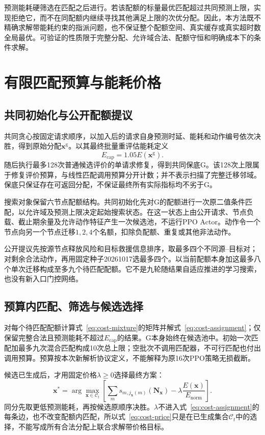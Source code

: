 预测能耗硬筛选在匹配之后进行。若该配额的标量最优匹配超过共同预测上限，实现拒绝它，而不在同配额内继续寻找其他满足上限的次优分配。因此，本方法既不精确求解带能耗约束的指派问题，也不保证整个配额空间、真实缓存或真实超时数全局最优。可验证的性质限于完整分配、允许域合法、配额守恒和明确成本下的条件求解。

\section{有限匹配预算与能耗价格}
\label{sec:ch5-search}
\subsection{共同初始化与公开配额提议}
共同贪心按固定请求顺序，以加入后的请求自身预测时延、能耗和动作编号依次决胜，得到原始分配$\mathbf x^{\mathrm g}$。以其最终批量重评估能耗定义
\begin{equation}
 E_{\mathrm{cap}}=1.05E(\mathbf x^{\mathrm g}).
 \label{eq:ch5-energy-cap}
\end{equation}
随后执行最多128次普通候选评价的单请求修复，得到共同保底G。该128次上限属于修复评价预算，与线性匹配调用预算分开计数；并不表示扫描了完整迁移邻域。保底只保证存在可返回分配，不保证最终所有实际指标均不劣于G。

搜索对象保留六节点配额结构。共同初始化先对G的配额进行一次原二值条件匹配，以允许域及预测上限决定起始搜索状态。在这一状态上由公开请求、节点负载、截止期余量及允许动作特征产生一次候选池，不运行PPO Actor。动作令一个节点向另一个节点迁移$1,2,4$个名额，扣除负配额、重复或其他非法动作。

公开提议先按源节点释放风险和目标救援信息排序，取最多四个不同源--目标对；对剩余合法动作，再用固定种子20261017选最多四个。以当前配额本身加这最多八个单次迁移构成至多九个待匹配配额。它不是九轮随结果自适应推进的学习搜索，也没有新入口门控网络。

\subsection{预算内匹配、筛选与候选选择}
对每个待匹配配额计算式~\eqref{eq:cost-mixture}的矩阵并解式~\eqref{eq:cost-assignment}；仅保留完整合法且预测能耗不超过$E_{\mathrm{cap}}$的结果。G本身始终在候选池中。初始一次匹配加最多九次混合匹配构成10次总上限；空批次不调用匹配器，不可行匹配也付出调用预算。预算按本次新解析协议定义，不能解释为原16次PPO策略无损截断。

候选已生成后，才用固定价格$\lambda\ge0$选择最终方案：
\begin{equation}
 \mathbf x^*=\arg\max_{\mathbf x\in\mathcal C_t}
 \left[\sum_m s_{m,j_{\mathbf x}(m)}(\mathbf N_{\mathbf x})
 -\lambda\frac{E(\mathbf x)}{E_{\mathrm{norm}}}\right].
 \label{eq:cost-price}
\end{equation}
同分先取更低预测能耗，再按候选原顺序决胜。$\lambda$不进入式~\eqref{eq:cost-assignment}的每条边，也不改变配额内匹配，所以式~\eqref{eq:cost-price}只是在已生成集合$\mathcal C_t$中的选择，不能写成所有合法分配上联合求解带价格目标。

